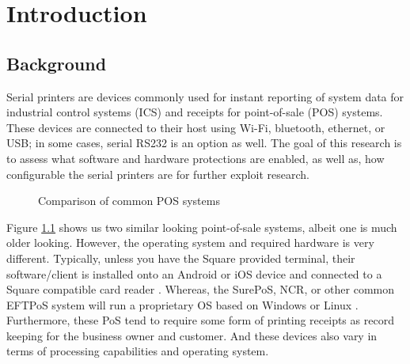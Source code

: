 \chapter{\leavevmode Introduction}
\label{chap:introduction}

\section{Background}  \label{background}

Serial printers are devices commonly used for instant reporting of system data for industrial control systems (ICS) and receipts for point-of-sale (POS) systems. These devices are connected to their host using Wi-Fi, bluetooth, ethernet, or USB; in some cases, serial RS232 is an option as well. The goal of this research is to assess what software and hardware protections are enabled, as well as, how configurable the serial printers are for further exploit research.

\begin{figure}[ht]%
  \centering
  \qquad
  \caption{Comparison of common POS systems}%
  \label{fig:comparison_pos}%
\end{figure}

Figure \ref{fig:comparison_pos} shows us two similar looking point-of-sale systems, albeit one is much older looking. However, the operating system and required hardware is very different. Typically, unless you have the Square provided terminal, their software/client is installed onto an Android or iOS device and connected to a Square compatible card reader \autocite{ondrusMobilePaymentsMarket2011}. Whereas, the SurePoS, NCR, or other common EFTPoS system will run a proprietary OS based on Windows or Linux \autocite{ebimoboweiROLESOFTWARECASHLESS2018}. Furthermore, these PoS tend to require some form of printing receipts as record keeping for the business owner and customer. And these devices also vary in terms of processing capabilities and operating system.


